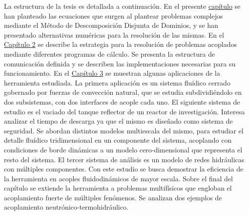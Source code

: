 La estructura de la tesis es detallada a continuación.
En el presente \hyperlink{chapter.1}{capítulo} se han planteado las ecuaciones que surgen al plantear problemas complejos mediante el Método de Descomposición Disjunta de Dominios,
y se han presentado alternativas numéricas para la resolución de las mismas.
En el \hyperlink{chapter.2}{Capítulo 2} se describe la estrategia para la resolución de problemas acoplados mediante diferentes programas de cálculo.
Se presenta la estructura de comunicación definida y se describen las implementaciones necesarias para su funcionamiento.
En el \hyperlink{chapter.3}{Capítulo 3} se muestran algunas aplicaciones de la herramienta estudiada.
La primera aplicación es un sistema fluídico cerrado gobernado por fuerzas de convección natural, que se estudia subdividiéndolo en dos subsistemas, con dos interfaces de acople cada uno.
El siguiente sistema de estudio es el vaciado del tanque reflector de un reactor de investigación.
Interesa analizar el tiempo de descarga ya que el mismo es diseñado como sistema de seguridad.
Se abordan distintos modelos multiescala del mismo, para estudiar el detalle fluídico tridimensional en un componente del sistema,
acoplando con condiciones de borde dinámicas a un modelo cero-dimensional que representa el resto del sistema.
El tercer sistema de análisis es un modelo de redes hidráulicas con múltiples componentes.
Con este estudio se busca demostrar la eficiencia de la herramienta en acoples fluidodinámicos de mayor escala.
Sobre el final del capítulo se extiende la herramienta a problemas multifísicos que engloban el acoplamiento fuerte de múltiples fenómenos.
Se analizan dos ejemplos de acoplamiento neutrónico-termohidráulico.

